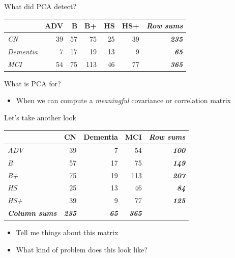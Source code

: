\documentclass[
  ignorenonframetext,
]{beamer}
\providecommand{\tightlist}{%
  \setlength{\itemsep}{0pt}\setlength{\parskip}{0pt}}
\begin{document}
\begin{frame}{What did PCA detect?}
\protect\hypertarget{what-did-pca-detect-1}{}

\begin{table}[H]
\centering
\begin{tabular}{>{\em}lrrrrr>{\bfseries\em}r}
\toprule
  & ADV & B & B+ & HS & HS+ & Row sums\\
\midrule
CN & 39 & 57 & 75 & 25 & 39 & 235\\
Dementia & 7 & 17 & 19 & 13 & 9 & 65\\
MCI & 54 & 75 & 113 & 46 & 77 & 365\\
\bottomrule
\end{tabular}
\end{table}

\end{frame}

\begin{frame}{What is PCA for?}
\protect\hypertarget{what-is-pca-for-1}{}

\begin{itemize}[<+->]
\tightlist
\item
  When we can compute a \emph{meaningful} covariance or correlation
  matrix
\end{itemize}

\end{frame}

\begin{frame}{Let's take another look}
\protect\hypertarget{lets-take-another-look}{}

\begin{table}[H]
\centering
\begin{tabular}{>{\em}lrrr>{\bfseries\em}r}
\toprule
  & CN & Dementia & MCI & Row sums\\
\midrule
ADV & 39 & 7 & 54 & 100\\
B & 57 & 17 & 75 & 149\\
B+ & 75 & 19 & 113 & 207\\
HS & 25 & 13 & 46 & 84\\
HS+ & 39 & 9 & 77 & 125\\
\addlinespace
\em{\textbf{Column sums}} & \em{\textbf{235}} & \em{\textbf{65}} & \em{\textbf{365}}\\
\bottomrule
\end{tabular}
\end{table}

\begin{itemize}[<+->]
\tightlist
\item
  Tell me things about this matrix
\item
  What kind of problem does this look like?
\end{itemize}

\end{frame}
\end{document}
